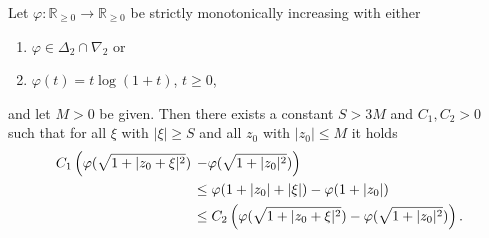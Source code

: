 \documentclass[10pt,a4paper]{amsart}
\newcommand{\R}{\mathbb{R}}
\begin{document}
	\begin{lemma} \label{lem:aux1}
		Let $\varphi: \R_{\geq 0} \to \R_{\geq 0}$ be strictly monotonically increasing with either 
		\begin{enumerate}
			\item  $\varphi \in \Delta_2 \cap \nabla_2$ or
			\item $\varphi(t)=t\log(1+t)$, $t\geq 0$, 
		\end{enumerate} 
		and let $M>0$ be given. 
		Then there exists a  constant $S>3M$ and $C_1,C_2>0$ such that for all $\xi$ with $|\xi|\geq S$ and all $z_0$ with $|z_0| \leq M$ it holds 
		\begin{align}
			C_1 \left( \varphi(\sqrt{1+|z_0+\xi|^2}) \right.&\left. - \varphi(\sqrt{1+|z_0|^2}) \right) \notag \\ & \leq \varphi(1+|z_0|+|\xi|) - \varphi(1+|z_0|) \label{eq:aux1.1} \\
			& \leq C_2 \left( \varphi(\sqrt{1+|z_0+\xi|^2}) - \varphi(\sqrt{1+|z_0|^2}) \right). \label{eq:aux1.2}
		\end{align}
	\end{lemma}
\end{document}
